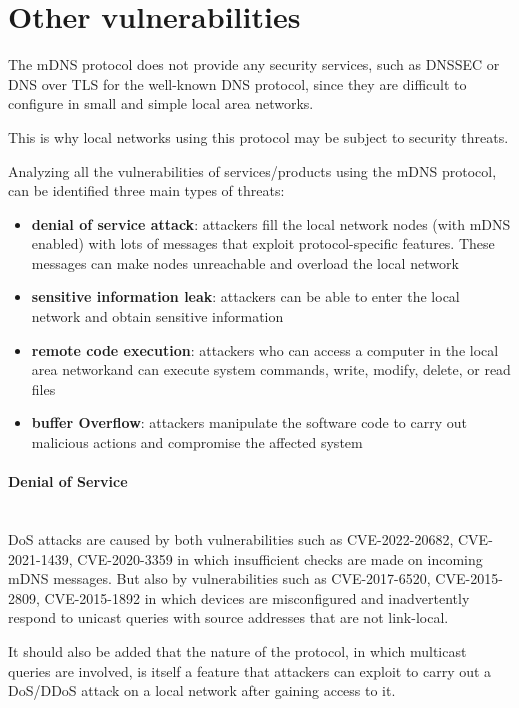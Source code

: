 \documentclass[fleqn, 11pt]{SelfArx} %
\begin{document}

\section{Other vulnerabilities}
The mDNS protocol does not provide any security services, such as DNSSEC or DNS over TLS for the well-known DNS protocol, since they are difficult to configure in small and simple local area networks. 

This is why local networks using this protocol may be subject to security threats. 

Analyzing all the vulnerabilities of services/products using the mDNS protocol, can be identified three main types of threats:
\begin{itemize}[leftmargin=*]
	\item {\textbf{denial of service attack}}: attackers fill the local network nodes (with mDNS enabled) with lots of messages that exploit protocol-specific features. These messages can make nodes unreachable and overload the local network
	\item {\textbf{sensitive information leak}}: attackers can be able to enter the local network and obtain sensitive information
	\item {\textbf{remote code execution}}: attackers who can access a computer in the local area networkand can execute system commands, write, modify, delete, or read files
	\item {\textbf{buffer Overflow}}: attackers manipulate the software code to carry out malicious actions and compromise the affected system 
\end{itemize}

\paragraph{Denial of Service}\mbox{}\\
DoS attacks are caused by both vulnerabilities such as CVE-2022-20682, CVE-2021-1439, CVE-2020-3359 in which insufficient checks are made on incoming mDNS messages. But also by vulnerabilities such as CVE-2017-6520, CVE-2015-2809, CVE-2015-1892 in which devices are misconfigured and inadvertently respond to unicast queries with source addresses that are not link-local.

It should also be added that the nature of the protocol, in which multicast queries are involved, is itself a feature that attackers can exploit to carry out a DoS/DDoS attack on a local network after gaining access to it. 
\end{document}
